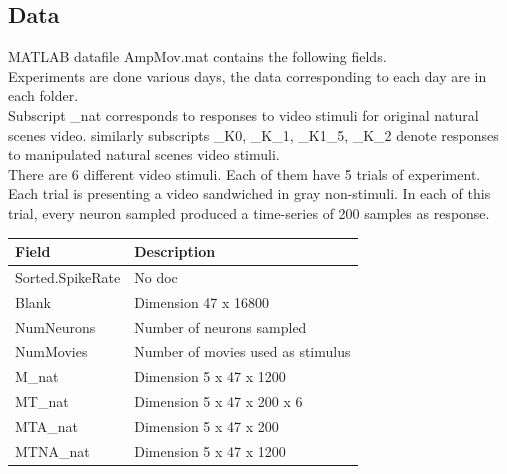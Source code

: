 \documentclass[11pt,paper=a4,answers]{exam}
\begin{document}
\subsection{Data} %
\label{sub:data}
MATLAB datafile AmpMov.mat contains the following fields.\\
Experiments are done various days, the data corresponding to each day are in each folder.\\
Subscript \_nat corresponds to responses to video stimuli for original natural scenes video. similarly subscripts \_K0, \_K\_1, \_K1\_5, \_K\_2 denote responses to manipulated natural scenes video stimuli.\\
There are 6 different video stimuli. Each of them have 5 trials of experiment. Each trial is presenting a video sandwiched in gray non-stimuli. In each of this trial, every neuron sampled produced a time-series of 200 samples as response.
\begin{center}
    \begin{tabular}{|l|l|}
        \hline
        Field                                 & Description \\
        \hline
        Sorted.SpikeRate                  & No doc \\
        Blank                             & Dimension 47 x 16800 \\
        NumNeurons                        & Number of neurons sampled \\
        NumMovies                         & Number of movies used as stimulus \\
        M\_nat                            & Dimension 5 x 47 x 1200 \\
        MT\_nat                           & Dimension 5 x 47 x 200 x 6 \\
        MTA\_nat                          & Dimension 5 x 47 x 200 \\
        MTNA\_nat                         & Dimension 5 x 47 x 1200 \\
        \hline    
    \end{tabular}
\end{center}

\end{document}

